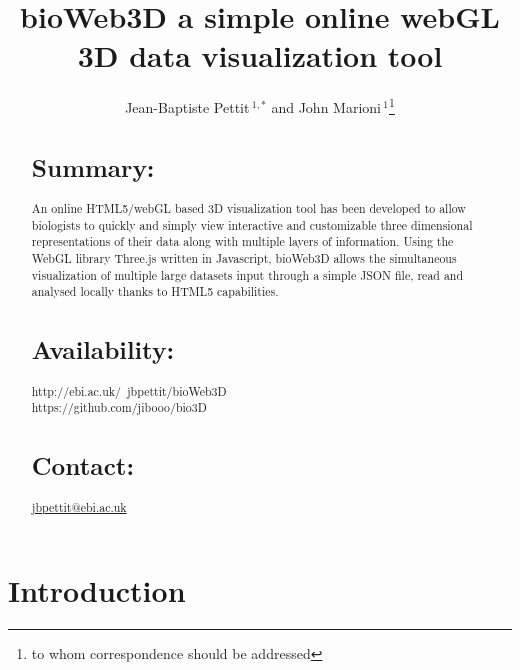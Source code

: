 \documentclass{bioinfo}
\begin{document}

\title[Application Note]{bioWeb3D a simple online webGL 3D data visualization tool}
\author[Sample \textit{et~al}]{Jean-Baptiste Pettit\,$^{1,*}$ and John Marioni\,$^{1}$\footnote{to whom correspondence should be addressed}}
\address{$^{1}$Department of XXXXXXX, Address XXXX etc.\\
$^{1}$European Bioinformatics Institute}



\maketitle

\begin{abstract}

\section{Summary:}
An online HTML5/webGL based 3D visualization tool has been developed to allow biologists to quickly and simply view interactive and customizable three dimensional representations of their data along with multiple layers of information. Using the WebGL library Three.js written in Javascript, bioWeb3D allows the simultaneous visualization of multiple large datasets input through a simple JSON file, read and analysed locally thanks to HTML5 capabilities.

\section{Availability:}
http://ebi.ac.uk/~jbpettit/bioWeb3D \\ https://github.com/jibooo/bio3D

\section{Contact:} \href{jbpettit@ebi.ac.uk}{jbpettit@ebi.ac.uk}
\end{abstract}

\section{Introduction}
\end{document}
